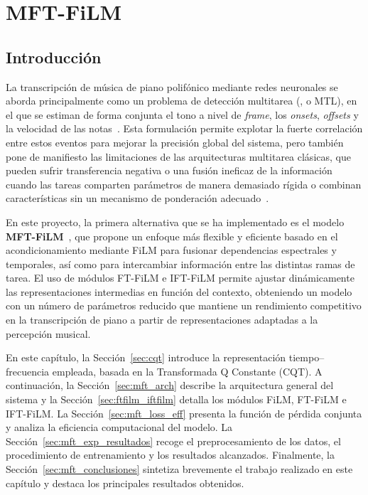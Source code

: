 \documentclass[11pt,spanish,listoffigures,listoftables]{tfgetsinf}
\begin{document}
\chapter{MFT-FiLM}
\label{chap:mft}

\section{Introducción}

La transcripción de música de piano polifónico mediante redes neuronales se aborda principalmente como un problema de detección multitarea (, o MTL),
en el que se estiman de forma conjunta el tono a nivel de \textit{frame}, los \textit{onsets}, \textit{offsets} y la velocidad de las notas~\cite{kong2021highres,hawthorne2018onsetsframes}. Esta formulación permite explotar la fuerte correlación entre estos eventos para mejorar la 
precisión global del sistema, pero también pone de manifiesto las limitaciones de las arquitecturas multitarea clásicas, que pueden sufrir transferencia negativa o una fusión ineficaz de la información cuando las tareas comparten parámetros 
de manera demasiado rígida o combinan características sin un mecanismo de ponderación adecuado~\cite{wang2025mftfilm}.


En este proyecto, la primera alternativa que se ha implementado es el modelo \textbf{MFT-FiLM}~\cite{wang2025mftfilm}, que propone un enfoque más flexible y eficiente 
basado en el acondicionamiento mediante FiLM para fusionar dependencias espectrales y temporales, así como para intercambiar información entre las
distintas ramas de tarea. El uso de módulos FT-FiLM e IFT-FiLM permite ajustar dinámicamente las representaciones intermedias en función del contexto, 
obteniendo un modelo con un número de parámetros reducido que mantiene un rendimiento competitivo en la transcripción de piano a partir de 
representaciones adaptadas a la percepción musical.

En este capítulo, la Sección~\ref{sec:cqt} introduce la representación tiempo--frecuencia empleada, basada en la Transformada Q Constante (CQT).
A continuación, la Sección~\ref{sec:mft_arch} describe la arquitectura general del sistema y la Sección~\ref{sec:ftfilm_iftfilm} detalla los módulos FiLM, FT-FiLM e IFT-FiLM.
La Sección~\ref{sec:mft_loss_eff} presenta la función de pérdida conjunta y analiza la eficiencia computacional del modelo.
La Sección~\ref{sec:mft_exp_resultados} recoge el preprocesamiento de los datos, el procedimiento de entrenamiento y los resultados alcanzados.
Finalmente, la Sección~\ref{sec:mft_conclusiones} sintetiza brevemente el trabajo realizado en este capítulo y destaca los principales resultados obtenidos.
\end{document}
